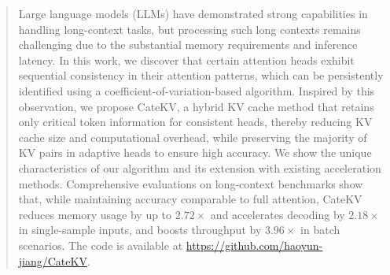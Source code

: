 \begin{abstract}
Large language models (LLMs) have demonstrated strong capabilities in handling long-context tasks, but processing such long contexts remains challenging due to the substantial memory requirements and inference latency. In this work, we discover that certain attention heads exhibit sequential consistency in their attention patterns, which can be persistently identified using a coefficient-of-variation-based algorithm. Inspired by this observation, we propose CateKV, a hybrid KV cache method that retains only critical token information for consistent heads, thereby reducing KV cache size and computational overhead, while preserving the majority of KV pairs in adaptive heads to ensure high accuracy. We show the unique characteristics of our algorithm and its extension with existing acceleration methods. Comprehensive evaluations on long-context benchmarks show that, while maintaining accuracy comparable to full attention, CateKV reduces memory usage by up to $2.72\times$ and accelerates decoding by $2.18\times$ in single-sample inputs, and boosts throughput by $3.96\times$ in batch scenarios. The code is available at \url{https://github.com/haoyun-jiang/CateKV}.
\end{abstract}
